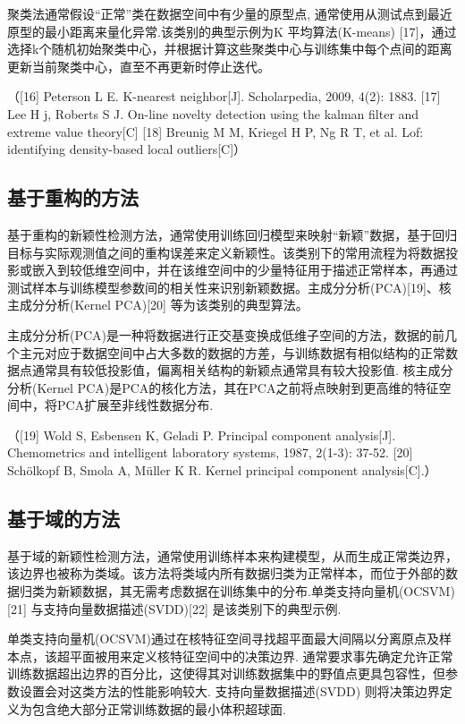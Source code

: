 \documentclass{Style/aas}
\begin{document}
\begin{multicols}{2}
  聚类法通常假设“正常”类在数据空间中有少量的原型点, 通常使用从测试点到最近原型的最小距离来量化异常.该类别的典型示例为K 平均算法(K-means) [17]，通过选择k个随机初始聚类中心，并根据计算这些聚类中心与训练集中每个点间的距离更新当前聚类中心，直至不再更新时停止迭代。

  （[16] Peterson L E. K-nearest neighbor[J]. Scholarpedia, 2009, 4(2): 1883.
  [17] Lee H j, Roberts S J. On-line novelty detection using the kalman filter and extreme value
  theory[C]
    [18] Breunig M M, Kriegel H P, Ng R T, et al. Lof: identifying density-based local outliers[C]）

  \subsection{基于重构的方法}
  基于重构的新颖性检测方法，通常使用训练回归模型来映射“新颖”数据，基于回归目标与实际观测值之间的重构误差来定义新颖性。该类别下的常用流程为将数据投影或嵌入到较低维空间中，并在该维空间中的少量特征用于描述正常样本，再通过测试样本与训练模型参数间的相关性来识别新颖数据。主成分分析(PCA)[19]、核主成分分析(Kernel PCA)[20] 等为该类别的典型算法。

  主成分分析(PCA)是一种将数据进行正交基变换成低维子空间的方法，数据的前几个主元对应于数据空间中占大多数的数据的方差，与训练数据有相似结构的正常数据点通常具有较低投影值，偏离相关结构的新颖点通常具有较大投影值. 核主成分分析(Kernel PCA)是PCA的核化方法，其在PCA之前将点映射到更高维的特征空间中，将PCA扩展至非线性数据分布.

  （[19] Wold S, Esbensen K, Geladi P. Principal component analysis[J]. Chemometrics and intelligent
  laboratory systems, 1987, 2(1-3): 37-52.
  [20] Schölkopf B, Smola A, Müller K R. Kernel principal component analysis[C].）

  \subsection{基于域的方法}
  基于域的新颖性检测方法，通常使用训练样本来构建模型，从而生成正常类边界，该边界也被称为类域。该方法将类域内所有数据归类为正常样本，而位于外部的数据归类为新颖数据，其无需考虑数据在训练集中的分布.单类支持向量机(OCSVM)[21] 与支持向量数据描述(SVDD)[22] 是该类别下的典型示例.

  单类支持向量机(OCSVM)通过在核特征空间寻找超平面最大间隔以分离原点及样本点，该超平面被用来定义核特征空间中的决策边界. 通常要求事先确定允许正常训练数据超出边界的百分比，这使得其对训练数据集中的野值点更具包容性，但参数设置会对这类方法的性能影响较大. 支持向量数据描述(SVDD) 则将决策边界定义为包含绝大部分正常训练数据的最小体积超球面.


\end{multicols}
\end{document}
